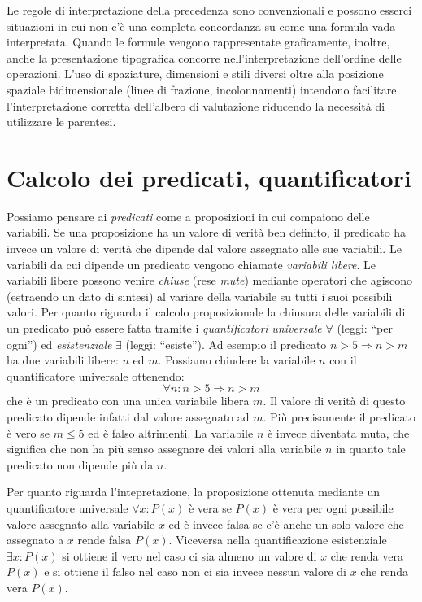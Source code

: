 \documentclass[italian,a4paper,hidelinks]{scrartcl}
\newcommand{\myemph}[1]{\emph{#1}\marginpar{#1}}
\begin{document}
Le regole di interpretazione della precedenza sono convenzionali
e possono esserci situazioni in cui non c'è una completa concordanza su come
una formula vada interpretata.
Quando le formule vengono rappresentate graficamente, inoltre,
anche la presentazione tipografica concorre nell'interpretazione
dell'ordine delle operazioni.
L'uso di spaziature, dimensioni e stili diversi oltre alla
posizione spaziale bidimensionale (linee di frazione, incolonnamenti)
intendono facilitare
l'interpretazione corretta dell'albero di valutazione riducendo
la necessità di utilizzare le parentesi.
\begin{comment}
Esempi di formule di dubbia interpretazione in
cui l'uso delle parentesi sarebbe invece auspicabile:
\[
  x/2\,y,\qquad
  \sin x \cdot 2, \qquad
  {e^x}^2, \qquad
  \frac{\displaystyle\frac{x}{y}}{z}.
\]
\end{comment}

\section{Calcolo dei predicati, quantificatori}

Possiamo pensare ai \myemph{predicati} come a proposizioni in cui
compaiono delle variabili.
Se una proposizione ha un valore di verità ben definito, il predicato
ha invece un valore di verità che dipende dal valore assegnato alle sue
variabili. Le variabili da cui dipende un predicato vengono chiamate
\myemph{variabili libere}. Le variabili libere possono venire \emph{chiuse}
(rese \emph{mute}) mediante operatori che agiscono
(estraendo un dato di sintesi) al variare della variabile su tutti i
suoi possibili valori.
Per quanto riguarda il calcolo proposizionale la chiusura delle variabili
di un predicato può essere fatta tramite i \myemph{quantificatori}
\emph{universale} $\forall$ (leggi: ``per ogni'') ed
\emph{esistenziale} $\exists$ (leggi: ``esiste'').
Ad esempio il predicato
$n>5 \Rightarrow n>m$ ha due variabili libere: $n$ ed $m$.
Possiamo chiudere la variabile $n$ con il quantificatore universale ottenendo:
\[
  \forall n \colon n>5 \Rightarrow n>m
\]
che è un predicato con una unica variabile libera $m$. Il valore di verità di questo
predicato dipende infatti dal valore assegnato ad $m$.
Più precisamente il predicato è vero se $m\le 5$ ed è falso altrimenti.
La variabile $n$ è invece diventata muta, che significa che non ha più senso
assegnare dei valori alla variabile $n$ in quanto tale predicato non dipende
più da $n$.

Per quanto riguarda l'intepretazione,
la proposizione ottenuta mediante un quantificatore universale
$\forall x\colon P(x)$ è vera se $P(x)$ è vera per ogni possibile valore
assegnato alla variabile $x$ ed è invece falsa se c'è anche un solo valore che
assegnato a $x$ rende falsa $P(x)$. Viceversa nella quantificazione
esistenziale $\exists x\colon P(x)$ si ottiene il vero nel caso ci sia almeno
un valore di $x$ che renda vera $P(x)$ e si ottiene il falso nel caso non ci sia
invece nessun valore di $x$ che renda vera $P(x)$.
\end{document}
